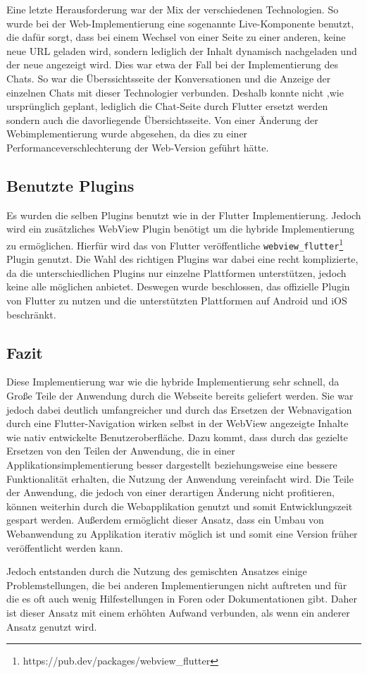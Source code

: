 Eine letzte Herausforderung war der Mix der verschiedenen Technologien. So wurde bei der Web-Implementierung eine sogenannte Live-Komponente benutzt, die dafür sorgt, dass bei einem Wechsel von einer Seite zu einer anderen, keine neue URL geladen wird, sondern lediglich der Inhalt dynamisch nachgeladen und der neue angezeigt wird. Dies war etwa der Fall bei der Implementierung des Chats. So war die Überssichtsseite der Konversationen und die Anzeige der einzelnen Chats mit dieser Technologier verbunden. Deshalb konnte nicht ,wie ursprünglich geplant, lediglich die Chat-Seite durch Flutter ersetzt werden sondern auch die davorliegende Übersichtsseite. Von einer Änderung der Webimplementierung wurde abgesehen, da dies zu einer Performanceverschlechterung der Web-Version geführt hätte.


\subsection{Benutzte Plugins}
Es wurden die selben Plugins benutzt wie in der Flutter Implementierung. Jedoch wird ein zusätzliches WebView Plugin benötigt um die hybride Implementierung zu ermöglichen. Hierfür wird das von Flutter veröffentliche \verb|webview_flutter|\footnote{https://pub.dev/packages/webview\_flutter} Plugin genutzt. Die Wahl des richtigen Plugins war dabei eine recht komplizierte, da die unterschiedlichen Plugins nur einzelne Plattformen unterstützen, jedoch keine alle möglichen anbietet. Deswegen wurde beschlossen, das offizielle Plugin von Flutter zu nutzen und die unterstützten Plattformen auf Android und iOS beschränkt.



\subsection{Fazit}
Diese Implementierung war wie die hybride Implementierung sehr schnell, da Große Teile der Anwendung durch die Webseite bereits geliefert werden. Sie war jedoch dabei deutlich umfangreicher und durch das Ersetzen der Webnavigation durch eine Flutter-Navigation wirken selbst in der WebView angezeigte Inhalte wie nativ entwickelte Benutzeroberfläche. Dazu kommt, dass durch das gezielte Ersetzen von den Teilen der Anwendung, die in einer Applikationsimplementierung  besser dargestellt beziehungsweise eine bessere Funktionalität erhalten, die Nutzung der Anwendung vereinfacht wird. Die Teile der Anwendung, die jedoch von einer derartigen Änderung nicht profitieren, können weiterhin durch die Webapplikation genutzt und somit Entwicklungszeit gespart werden. Außerdem ermöglicht dieser Ansatz, dass ein Umbau von Webanwendung zu Applikation iterativ möglich ist und somit eine Version früher veröffentlicht werden kann.

Jedoch entstanden durch die Nutzung des gemischten Ansatzes einige Problemstellungen, die bei anderen Implementierungen nicht auftreten und für die es oft auch wenig Hilfestellungen in Foren oder Dokumentationen gibt. Daher ist dieser Ansatz mit einem erhöhten Aufwand verbunden, als wenn ein anderer Ansatz genutzt wird.